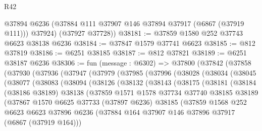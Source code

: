 \begin{lexlean}{R42}
\begin{coremodule}
{        @37894
        @6236
        (@37884 @111 @37907 @146 @37894 @37917 (@6867 (@37919 @111)))
        @37924)
      (@37927 @37728))
@38181 := @37859 @1580 @252 @37743 @6623 @38138 @6236
@38184 := @37847 @1579 @37741 @6623
@38185 := @812 @37819
@38186 := @6251 @38185
@38187 := @812 @37821
@38189 := @6251 @38187 @6236
@38306 := fun (message : @6302) =>
  @37800
    (@37842
      (@37858
        (@37930
          (@37936
            (@37947
              (@37979
                (@37985
                  (@37996
                    (@38028
                      (@38034
                        (@38045
                          (@38077
                            (@38083
                              (@38094
                                (@38126
                                  (@38132
                                    (@38143
                                      (@38175
                                        (@38181
                                          (@38184
                                            (@38186 @38189)
                                            @38138
                                            (@37859
                                              @1571
                                              @1578
                                              @37734
                                              @37740
                                              @38185
                                              @38189
                                              (@37867
                                                @1570
                                                @6625
                                                @37733
                                                (@37897 @6236)
                                                @38185
                                                (@37859
                                                  @1568
                                                  @252
                                                  @6623
                                                  @6623
                                                  @37896
                                                  @6236
                                                  (@37884
                                                    @164
                                                    @37907
                                                    @146
                                                    @37896
                                                    @37917
                                                    (@6867 (@37919 @164)))
}
\end{coremodule}
\end{lexlean}
